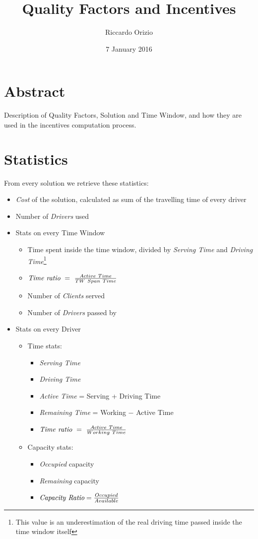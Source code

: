 \documentclass[10pt, letterpaper]{article}
\title{Quality Factors and Incentives}
\author{Riccardo Orizio}
\date{7 January 2016}
\begin{document}
\maketitle

\section{Abstract}
Description of Quality Factors, Solution and Time Window, and how they are used
in the incentives computation process.

\section{Statistics}
From every solution we retrieve these statistics:
\begin{itemize}
	\item \emph{Cost} of the solution, calculated as sum of the travelling time
		of every driver
	\item Number of \emph{Drivers} used
	\item Stats on every Time Window
		\begin{itemize}
			\item Time spent inside the time window, divided by \emph{Serving
				Time} and \emph{Driving Time}\footnote{This value is an
				underestimation of the real driving time passed inside the time
				window itself}
			\item $\emph{Time ratio}\ =\ \frac{Active\ Time}{TW\ Span\ Time}$
			\item Number of \emph{Clients} served
			\item Number of \emph{Drivers} passed by
		\end{itemize}
	\item Stats on every Driver
		\begin{itemize}
			\item Time stats:
				\begin{itemize}
					\item \emph{Serving Time}
					\item \emph{Driving Time}
					\item \emph{Active Time} = Serving + Driving Time
					\item \emph{Remaining Time} = Working $-$ Active Time
					\item $\emph{Time ratio}\ =\ \frac{Active\ Time}{Working\ Time}$
				\end{itemize}
			\item Capacity stats:
				\begin{itemize}
					\item \emph{Occupied} capacity
					\item \emph{Remaining} capacity
					\item $\emph{Capacity Ratio} = \frac{Occupied}{Available}$
				\end{itemize}
		\end{itemize}
\end{itemize}
\end{document}
